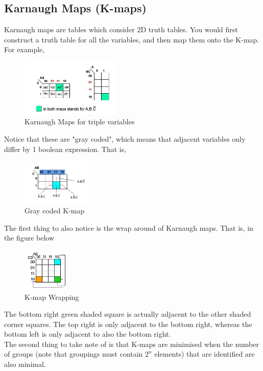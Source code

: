 \documentclass[a4paper]{article}
\theoremstyle{plain}
\theoremstyle{definition}
\theoremstyle{remark}
\begin{document}
\subsection{Karnaugh Maps (K-maps)}
Karnaugh maps are tables which consider $2$D truth tables. You would first construct a truth table for all the variables, and then map them onto the K-map. For example,
\begin{figure}[H]
	\centering
	\includegraphics[width=0.42\textwidth]{figures/k1.png}
	\caption{Karnaugh Maps for triple variables}
	\label{fig:figures-k1-png}
\end{figure}
Notice that these are "gray coded", which means that adjacent variables only differ by 1 boolean expression. That is,
\begin{figure}[H]
	\centering
	\includegraphics[width=0.3\textwidth]{figures/k2.png}
	\caption{Gray coded K-map}
	\label{fig:graycode}
\end{figure}
The first thing to also notice is the wrap around of Karnaugh maps. That is, in the figure below
\begin{figure}[H]
	\centering
	\includegraphics[width=0.2\textwidth]{figures/k3.png}
	\caption{K-map Wrapping}
	\label{fig:figures-k3-png}
\end{figure}
The bottom right green shaded square is actually adjacent to the other shaded corner squares. The top right is only adjacent to the bottom right, whereas the bottom left is only adjacent to also the bottom right.\\
The second thing to take note of is that K-maps are minimised when the number of groups (note that groupings must contain $2^{n}$ elements) that are identified are also minimal.
\end{document}
